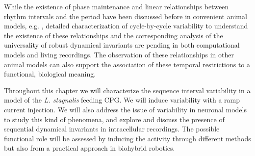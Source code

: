 While the existence of phase maintenance and linear relationships between rhythm intervals and the period have been discussed before in convenient animal models, e.g. \cite{grillner_generation_1976,hooper_phase_1997,vavoulis_dynamic_2007}, detailed characterization of cycle-by-cycle variability to understand the existence of these relationships and the corresponding analysis of the universality of robust dynamical invariants are pending in both computational models and living recordings. The observation of these relationships in other animal models can also support the association of these temporal restrictions to a functional, biological meaning.

Throughout this chapter we will characterize the sequence interval variability in a model of the \textit{L. stagnalis} feeding CPG. We will induce variability with a ramp current injection. We will also address the issue of variability in neuronal models to study this kind of phenomena, and explore and discuss the presence of sequential dynamical invariants in intracellular recordings. The possible functional role will be assessed by inducing the activity through different methods but also from a practical approach in biohybrid robotics. 



